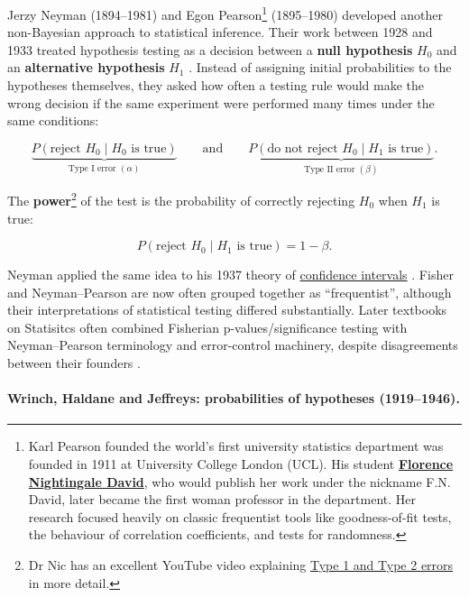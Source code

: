 Jerzy Neyman (1894--1981) and Egon Pearson\footnote{ Karl Pearson founded the world's first university statistics department was founded in 1911 at University College London (UCL). His student \href{https://en.wikipedia.org/wiki/Florence_Nightingale_David}{\textbf{Florence Nightingale David}}, who would publish her work under the nickname F.N. David, later became the first woman professor in the department. Her research focused heavily on classic frequentist tools like goodness-of-fit tests, the behaviour of correlation coefficients, and tests for randomness.} (1895--1980) developed another non-Bayesian approach to statistical inference. Their work between 1928 and 1933 treated hypothesis testing as a decision between a \textbf{null hypothesis} $H_0$ and an \textbf{alternative hypothesis} $H_1$ \cite{neymanpearson1928,neymanpearson1933}. Instead of assigning initial probabilities to the hypotheses themselves, they asked how often a testing rule would make the wrong decision if the same experiment were performed many times under the same conditions:

\begin{equation}
\underbrace{P(\text{reject }H_0 \mid H_0 \text{ is true})}_{\text{Type I error }(\alpha)}
\qquad\text{and}\qquad
\underbrace{P(\text{do not reject }H_0 \mid H_1 \text{ is true})}_{\text{Type II error }(\beta)}.
\end{equation}

The \textbf{power}\footnote{Dr Nic has an excellent YouTube video explaining \href{https://youtu.be/edzQQFNzFjM?si=ZIDEkYKkMHhuys9M}{
Type 1 and Type 2 errors} in more detail.} of the test is the probability of correctly rejecting $H_0$ when $H_1$ is true:

\begin{equation}
P(\text{reject }H_0 \mid H_1 \text{ is true})
=
1-\beta.
\end{equation}

Neyman applied the same idea to his 1937 theory of \href{https://en.wikipedia.org/wiki/Confidence_interval}{confidence intervals} \cite{neyman1937}. Fisher and Neyman--Pearson are now often grouped together as ``frequentist'', although their interpretations of statistical testing differed substantially. Later textbooks on Statisitcs often combined Fisherian p-values/significance testing with Neyman–Pearson terminology and error-control machinery, despite disagreements between their founders \cite{lehmann2011,perezgonzalez2015}.

\paragraph{Wrinch, Haldane and Jeffreys: probabilities of hypotheses
(1919--1946).}


